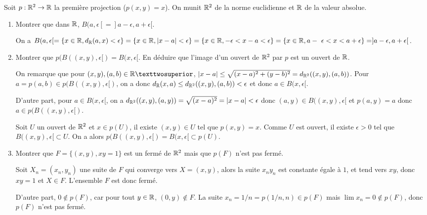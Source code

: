 \documentclass[a4paper]{tp_um}
\begin{document}
Soit $p:{\Bbb R}^2\rightarrow {\Bbb R}$ la premi\`ere projection ($p(x,y)=x$). On munit ${\Bbb R}^2$ de la norme euclidienne et $\Bbb R$ de la valeur absolue. %
\begin{enumerate}
\item Montrer que dans $\Bbb R$, $B(a,\epsilon[=]a-\epsilon,a+\epsilon[$.  


			\bigskip		
On a $B(a,\epsilon[=\{x\in {\Bbb R}, d_{\Bbb R}(a,x)<\epsilon\}=\{x\in {\Bbb R}, |x-a|<\epsilon\}=\{x\in {\Bbb R}, -\epsilon<x-a<\epsilon\}=\{x\in {\Bbb R},a- \epsilon<x<a+\epsilon\}=]a-\epsilon,a+\epsilon[$.
	
			

			\bigskip			
			
\item Montrer que $p(B((x,y),\epsilon[)=B(x,\epsilon[$. En d\'eduire que l'image d'un ouvert de ${\Bbb R}^2$ par $p$ est un ouvert de $\Bbb R$.
	
			\bigskip		
			
						
			On remarque que pour $(x,y),(a,b)\in {\Bbb R}²$, $|x-a|\le \sqrt{(x-a)^2+(y-b)^2}= d_{\Bbb R^2}((x,y),(a,b))$. Pour $a=p(a,b)\in p(B((x,y),\epsilon[)$, on a donc $d_{\Bbb R}(x,a)\le d_{\Bbb R^2} ((x,y),(a,b))<\epsilon$ et donc $a\in B(x,\epsilon[$.

D'autre part, pour $a\in B(x,\epsilon[$, on a $d_{\Bbb R^2 }((x,y),(a,y))=\sqrt{(x-a)^2}=|x-a|<\epsilon$ donc $(a,y) \in B((x,y),\epsilon[$ et $p(a,y)=a$ donc $a\in p(B((x,y),\epsilon[)$.

Soit $U$ un ouvert de ${\Bbb R}^2$ et $x\in p(U)$, il existe $(x,y)\in U$ tel que $p(x,y)=x$. Comme $U$ est ouvert, il existe $\epsilon>0$ tel que $B((x,y),\epsilon[\subset U$. On a alors $p(B((x,y),\epsilon[)=B(x,\epsilon[\subset p(U)$.

			
			
			\bigskip
\item Montrer que $F=\{(x,y), xy=1\}$ est un ferm\'e de ${\Bbb R}^2$ mais que $p(F)$ n'est pas ferm\'e.
			
			\bigskip
				
Soit $X_n=(x_n,y_n)$ une suite de $F$ qui converge vers $X=(x,y)$, alors la suite $x_ny_n$ est constante \'egale \`a $1$, et tend vers $xy$, donc $xy=1$ et $X\in F$. L'ensemble $F$ est donc ferm\'e.

D'autre part, $0\notin p(F)$, car pour tout $y\in \Bbb R$, $(0,y)\notin F$. La suite $x_n=1/n=p(1/n,n)\in p(F)$ mais $\lim x_n=0\notin p(F)$, donc $p(F)$ n'est pas ferm\'e.


\end{enumerate}
\end{document}
